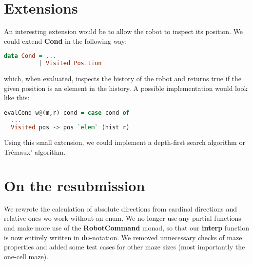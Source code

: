 \documentclass[a4paper]{article}
\newcommand{\func}[1]{\textbf{\ttfamily #1}\xspace}
\begin{document}
\section{Extensions}
An interesting extension would be to allow the robot to inspect its
position. We could extend \func{Cond} in the following way:
\begin{lstlisting}[language=haskell]
data Cond = ...
          | Visited Position
\end{lstlisting}
which, when evaluated, inspects the history of the robot and returns
true if the given position is an element in the history. A possible implementation would look like this:
\begin{lstlisting}[language=haskell]
evalCond w@(m,r) cond = case cond of
  ...
  Visited pos -> pos `elem` (hist r)
\end{lstlisting}
Using this small extension, we could implement a depth-first search algorithm or
Trémaux' algorithm.

\section{On the resubmission}
We rewrote the calculation of absolute directions from cardinal directions and relative ones wo work without an enum. We no longer use any partial functions and make more use of the \textbf{RobotCommand} monad, so that our \textbf{interp} function is now entirely written in \textbf{do}-notation. We removed unnecessary checks of maze properties and added some test cases for other maze sizes (most importantly the one-cell maze). 
\end{document}
